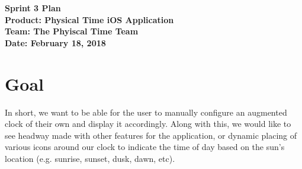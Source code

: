 \documentclass[11pt]{article}
\newcommand\tab[1][1cm]{\hspace*{#1}}
\begin{document}
	\Large{\textbf{Sprint 3 Plan}}\\
	\Large{\textbf{Product: Physical Time iOS Application}}\\
	\Large{\textbf{Team: The Phyiscal Time Team}}\\
	\Large{\textbf{Date: February 18, 2018}}\\
	
	\vspace{-3mm}
	
	\section{Goal}
		\vspace{-3mm}
		\tab \normalsize{In short, we want to be able for the user to manually configure an augmented clock of their own and display it accordingly. Along with this, we would like to see headway made with other features for the application, or dynamic placing of various icons around our clock to indicate the time of day based on the sun's location (e.g. sunrise, sunset, dusk, dawn, etc).}
		
\end{document}
